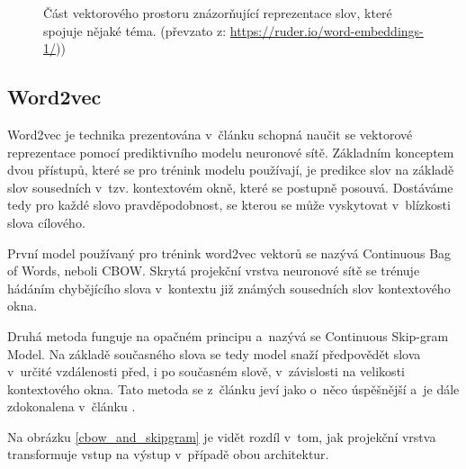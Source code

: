 \begin{figure}[hbt]
	\centering
	\caption{Část vektorového prostoru znázorňující reprezentace slov, které spojuje nějaké téma. (převzato z: \url{https://ruder.io/word-embeddings-1/}))}
	\label{word_embeddings}
\end{figure}

\subsection{Word2vec}

Word2vec je technika prezentována v~článku \cite{mikolov2013embeddings} schopná naučit se vektorové reprezentace pomocí prediktivního modelu neuronové sítě. Základním konceptem dvou přístupů, které se pro trénink modelu používají, je predikce slov na základě slov sousedních v~tzv. kontextovém okně, které se postupně posouvá. Dostáváme tedy pro každé slovo pravděpodobnost, se kterou se může vyskytovat v~blízkosti slova cílového.\par
První model používaný pro trénink word2vec vektorů se nazývá Continuous Bag of Words, neboli CBOW. Skrytá projekční vrstva neuronové sítě se trénuje hádáním chybějícího slova v~kontextu již známých sousedních slov kontextového okna.\par
Druhá metoda funguje na opačném principu a~nazývá se Continuous Skip-gram Model. Na základě současného slova se tedy model snaží předpovědět slova v~určité vzdálenosti před, i po současném slově, v~závislosti na velikosti kontextového okna. Tato metoda se z~článku \cite{mikolov2013embeddings} jeví jako o~něco úspěšnější a~je dále zdokonalena v~článku \cite{mikolov2013_2}.\par
Na obrázku \ref{cbow_and_skipgram} je vidět rozdíl v~tom, jak projekční vrstva transformuje vstup na výstup v~případě obou architektur.

